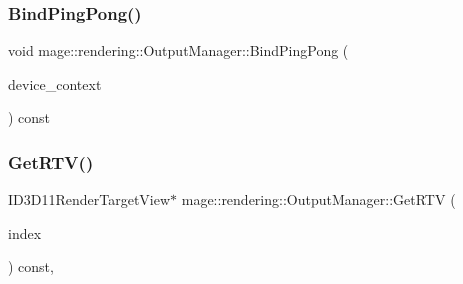 \hypertarget{classmage_1_1rendering_1_1_output_manager_aacb8da12f24fe9b7f1c3aac6f52ba9a1}{}\label{classmage_1_1rendering_1_1_output_manager_aacb8da12f24fe9b7f1c3aac6f52ba9a1} 
\subsubsection{\texorpdfstring{Bind\+Ping\+Pong()}{BindPingPong()}}
{\footnotesize\ttfamily void mage\+::rendering\+::\+Output\+Manager\+::\+Bind\+Ping\+Pong (\begin{DoxyParamCaption}\item[{I\+D3\+D11\+Device\+Context \&}]{device\+\_\+context }\end{DoxyParamCaption}) const\hspace{0.3cm}{\ttfamily [noexcept]}}

\hypertarget{classmage_1_1rendering_1_1_output_manager_a2088241f582fd9b119f485c5e9a13b30}{}\label{classmage_1_1rendering_1_1_output_manager_a2088241f582fd9b119f485c5e9a13b30} 
\subsubsection{\texorpdfstring{Get\+R\+T\+V()}{GetRTV()}}
{\footnotesize\ttfamily I\+D3\+D11\+Render\+Target\+View$\ast$ mage\+::rendering\+::\+Output\+Manager\+::\+Get\+R\+TV (\begin{DoxyParamCaption}\item[{\hyperlink{classmage_1_1rendering_1_1_output_manager_af9caebb7e9cacf454d26b827a01e857c}{R\+T\+V\+Index}}]{index }\end{DoxyParamCaption}) const\hspace{0.3cm}{\ttfamily [private]}, {\ttfamily [noexcept]}}

\hypertarget{classmage_1_1rendering_1_1_output_manager_a0dc5e124cbd78351b78cc7a3e7bff428}{}\label{classmage_1_1rendering_1_1_output_manager_a0dc5e124cbd78351b78cc7a3e7bff428} 

